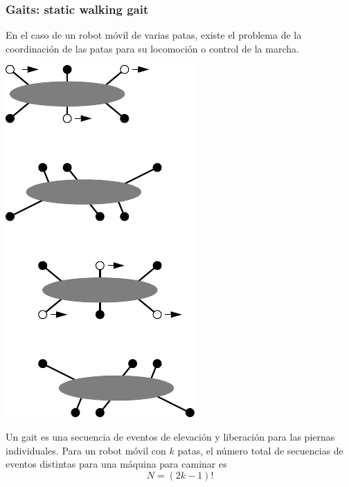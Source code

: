 \begin{frame}
    \frametitle{Gaits: static walking gait}
	\small
    En el caso de un robot móvil de varias patas, existe el problema de la coordinación de las patas para su locomoción o control de la marcha.

    \begin{center}
        \includegraphics[width=0.15\columnwidth]{images/hexapod_static_walking_gait.pdf}
    \end{center}

    Un gait es una secuencia de eventos de elevación y liberación para las piernas individuales. Para un robot móvil con $k$ patas, el número total de secuencias de eventos distintas para una máquina para caminar es
    \begin{equation*}
        N = \left( 2k - 1\right)!
    \end{equation*}

\end{frame}

